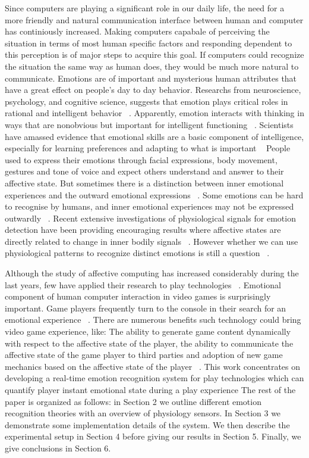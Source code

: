 \documentclass{uofsthesis-cs}
\begin{document}
Since computers are playing a significant role in our daily life, the need for a more friendly and natural communication interface between human and computer has continiously increased. Making computers capabale of perceiving the situation in terms of most human specific factors and responding dependent to this perception is of major steps to acquire this goal. If computers could recognize the situation the same way as human does, they would be much more natural to communicate. Emotions are of important and mysterious human attributes that have a great effect on people's day to day behavior. Researchs from neuroscience, psychology, and cognitive science, suggests that emotion plays critical roles in rational and intelligent behavior ~\cite{picard2001toward}. Apparently, emotion interacts with thinking in ways that are nonobvious but important for intelligent functioning ~\cite{picard2001toward}. Scientists have amassed evidence that emotional skills are a basic component of intelligence, especially for learning preferences and adapting to what is important ~\cite{mayer1993intelligence, goleman2006emotional} People used to express their emotions through facial expressions, body movement, gestures and tone of voice and expect others understand and answer to their affective state. But sometimes there is a distinction between inner emotional experiences and the outward emotional expressions ~\cite{picard2003affective}. Some emotions can be hard to recognise by humans, and inner emotional experiences may not be expressed outwardly ~\cite{jones2007biometric}. Recent extensive investigations of physiological signals for emotion detection have been providing encouraging results where affective states are directly related to change in inner bodily signals ~\cite{jones2007biometric}. However whether we can use physiological patterns to recognize distinct emotions is still a question ~\cite{picard2001toward, cacioppo1990inferring}.

Although the study of affective computing has increased considerably during the last years, few have applied their research to play technologies ~\cite{sykes2003affective}. Emotional component of human computer interaction in video games is surprisingly important. Game players frequently turn to the console in their search for an emotional experience ~\cite{rouse2010game}. There are numerous benefits such technology could bring video game experience, like: The ability to generate game content dynamically with respect to the affective state of the player, the ability to communicate the affective state of the game player to third parties and adoption of new game mechanics based on the affective state of the player ~\cite{sykes2003affective}. This work concentrates on developing a real-time emotion recognition system for play technologies which can quantify player instant emotional state during a play experience The rest of the paper is organized as follows: in Section 2 we outline different emotion recognition theories with an overview of physiology sensors. In Section 3 we demonstrate some implementation details of the system. We then describe the experimental setup in Section 4 before giving our results in Section 5. Finally, we give conclusions in Section 6.
\end{document}
